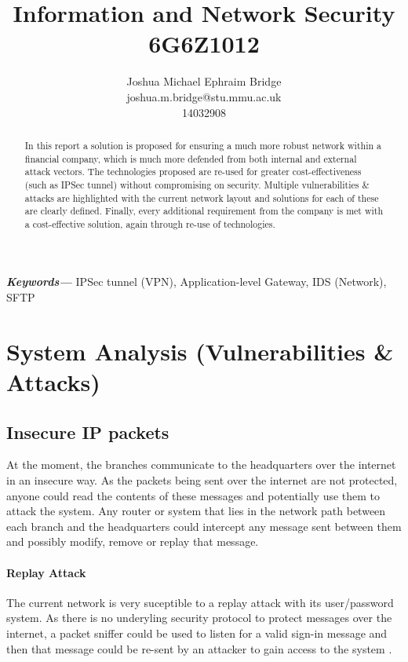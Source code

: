\documentclass[11pt]{article}
\title{\vspace{2cm}\textbf{Information and Network Security}\\6G6Z1012}
\author{Joshua Michael Ephraim Bridge\\joshua.m.bridge@stu.mmu.ac.uk\\14032908}
\providecommand{\keywords}[1] {
  \small
  \textbf{\textit{Keywords---}} #1
}
\begin{document}
  \maketitle

  \vspace{1cm}

  \begin{abstract}
    In this report a solution is proposed for ensuring a much more robust network within a financial company, which is much more defended from both internal and external attack vectors. The technologies proposed are re-used for greater cost-effectiveness (such as IPSec tunnel) without compromising on security. Multiple vulnerabilities \& attacks are highlighted with the current network layout and solutions for each of these are clearly defined. Finally, every additional requirement from the company is met with a cost-effective solution, again through re-use of technologies.
  \end{abstract}

  \vspace{0.5cm}

  \keywords{IPSec tunnel (VPN), Application-level Gateway, IDS (Network), SFTP}

  \newpage


  \section{System Analysis (Vulnerabilities \& Attacks)}
    \subsection{Insecure IP packets}
      At the moment, the branches communicate to the headquarters over the internet in an insecure way. As the packets being sent over the internet are not protected, anyone could read the contents of these messages and potentially use them to attack the system. Any router or system that lies in the network path between each branch and the headquarters could intercept any message sent between them and possibly modify, remove or replay that message.

      \paragraph{Replay Attack}
        The current network is very suceptible to a replay attack with its user/password system. As there is no underyling security protocol to protect messages over the internet, a packet sniffer could be used to listen for a valid sign-in message and then that message could be re-sent by an attacker to gain access to the system \citep{owaspReplayAttack}.
\end{document}
